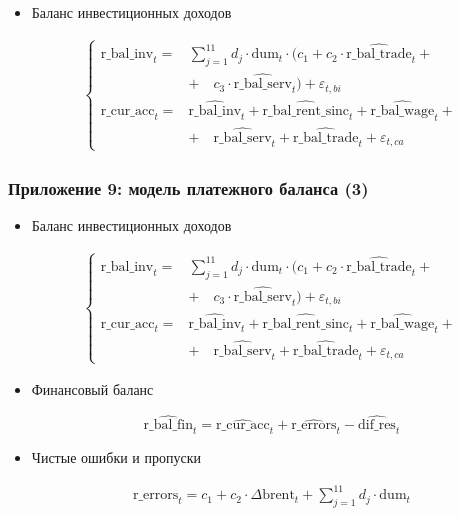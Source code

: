 \documentclass[9pt]{beamer}
\newcommand{\lsum}{\sum\limits}
\begin{document}
\begin{frame}
\begin{itemize}
		\item Баланс инвестиционных доходов
		
		\begin{align*}
		\begin{cases}
		\text{r\_bal\_inv}_t =& \lsum_{j = 1}^{11} d_j \cdot \text{dum}_t \cdot (c_1 + c_2 \cdot \widehat{\text{r\_bal\_trade}}_t + \\
		& + \quad c_3 \cdot \widehat{\text{r\_bal\_serv}}_t) + \varepsilon_{t, bi} \\ 
		\text{r\_cur\_acc}_t =& \widehat{\text{r\_bal\_inv}}_t + \widehat{ \text{r\_bal\_rent\_sinc}}_t + \widehat{\text{r\_bal\_wage}}_t +\\ & + \quad \widehat{\text{r\_bal\_serv}}_t +
		\widehat{\text{r\_bal\_trade}}_t + \varepsilon_{t, ca} 
		\end{cases}
		\end{align*} 
	\end{itemize}
\end{frame}

\begin{frame}
	\frametitle{Приложение 9: модель платежного баланса (3)}
	\footnotesize
	\begin{itemize}		
		\item Баланс инвестиционных доходов
		
		\begin{align*}
		\begin{cases}
		\text{r\_bal\_inv}_t =& \lsum_{j = 1}^{11} d_j \cdot \text{dum}_t \cdot (c_1 + c_2 \cdot \widehat{\text{r\_bal\_trade}}_t + \\
		& + \quad c_3 \cdot \widehat{\text{r\_bal\_serv}}_t) + \varepsilon_{t, bi} \\ 
		\text{r\_cur\_acc}_t =& \widehat{\text{r\_bal\_inv}}_t + \widehat{ \text{r\_bal\_rent\_sinc}}_t + \widehat{\text{r\_bal\_wage}}_t +\\ & + \quad \widehat{\text{r\_bal\_serv}}_t +
		\widehat{\text{r\_bal\_trade}}_t + \varepsilon_{t, ca} 
		\end{cases}
		\end{align*} 
		
		\item Финансовый баланс
		
		\[
		\widehat{\text{r\_bal\_fin}}_t = \widehat{\text{r\_cur\_acc}}_t + \widehat{\text{r\_errors}}_t - \widehat{\text{dif\_res}}_t
		\]
		

		\item Чистые ошибки и пропуски
		
		\begin{align*}
		\text{r\_errors}_t = c_1 + c_2\cdot \Delta \text{brent}_t  + \lsum_{j = 1}^{11} d_j \cdot \text{dum}_t
		\end{align*}
	\end{itemize}
\end{frame}
\end{document}

